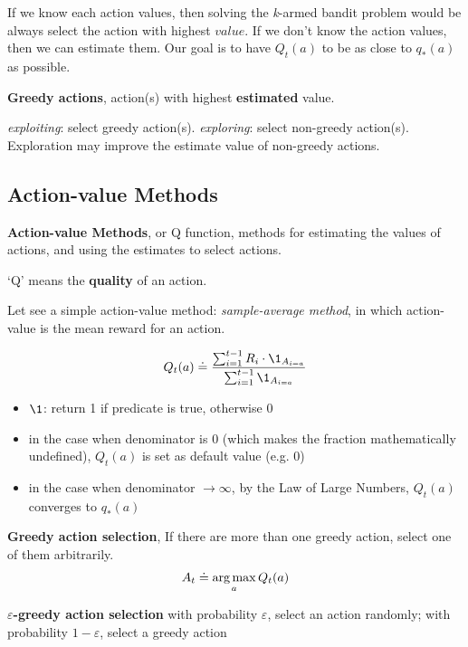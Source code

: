 \documentclass[sutton_barto_notes.tex]{subfiles}
\begin{document}
If we know each action values, then solving the \textit{k}-armed bandit problem would be always select the action with highest $value$.
If we don't know the action values, then we can estimate them.
Our goal is to have $Q_t(a)$ to be as close to $q_*(a)$ as possible.

\begin{definition}
\textbf{Greedy actions}, action(s) with highest \textbf{estimated} value.
\end{definition}
\textit{exploiting}: select greedy action(s).
\textit{exploring}: select non-greedy action(s). Exploration may improve the estimate value of non-greedy actions.

\subsection{Action-value Methods}

\begin{definition}
\textbf{Action-value Methods}, or Q function, methods for estimating the values of actions, and using the estimates to select actions.
\end{definition}

`Q' means the \textbf{quality} of an action.

Let see a simple action-value method: \textit{sample-average method}, in which action-value is the mean reward for an action.

$$ Q_t(a) \doteq \frac{\sum_{i=1}^{t-1}R_i \cdot \1_{A_{i=a}}}{\sum_{i=1}^{t-1}\1_{A_{i=a}}}$$

\begin{itemize}
	\item $\1$: return 1 if predicate is true, otherwise 0
	\item in the case when denominator is 0 (which makes the fraction mathematically undefined), $Q_t(a)$ is set as default value (e.g. 0)
	\item in the case when denominator $\rightarrow \infty$, by the Law of Large Numbers, $Q_t(a)$ converges to $q_*(a)$
\end{itemize}

\begin{definition}
\textbf{Greedy action selection}, If there are more than one greedy action, select one of them arbitrarily.
$$ A_t \doteq \operatorname*{arg\,max}_{a} Q_t(a) $$
\end{definition}

\begin{definition}
\textbf{$\varepsilon$-greedy action selection} with probability $\varepsilon$, select an action randomly; with probability $1-\varepsilon$, select a greedy action
\end{definition}
\end{document}
